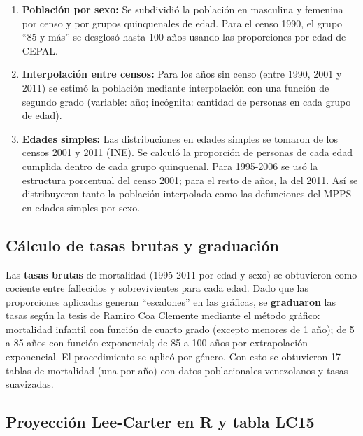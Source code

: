 \documentclass[
  11pt,
  a4paper,
]{article}
\begin{document}
\begin{enumerate}
\def\labelenumi{\arabic{enumi}.}
\item
  \textbf{Población por sexo:} Se subdividió la población en masculina y
  femenina por censo y por grupos quinquenales de edad. Para el censo
  1990, el grupo ``85 y más'' se desglosó hasta 100 años usando las
  proporciones por edad de CEPAL.
\item
  \textbf{Interpolación entre censos:} Para los años sin censo (entre
  1990, 2001 y 2011) se estimó la población mediante interpolación con
  una función de segundo grado (variable: año; incógnita: cantidad de
  personas en cada grupo de edad).
\item
  \textbf{Edades simples:} Las distribuciones en edades simples se
  tomaron de los censos 2001 y 2011 (INE). Se calculó la proporción de
  personas de cada edad cumplida dentro de cada grupo quinquenal. Para
  1995-2006 se usó la estructura porcentual del censo 2001; para el
  resto de años, la del 2011. Así se distribuyeron tanto la población
  interpolada como las defunciones del MPPS en edades simples por sexo.
\end{enumerate}

\subsection{Cálculo de tasas brutas y
graduación}\label{cuxe1lculo-de-tasas-brutas-y-graduaciuxf3n}

Las \textbf{tasas brutas} de mortalidad (1995-2011 por edad y sexo) se
obtuvieron como cociente entre fallecidos y sobrevivientes para cada
edad. Dado que las proporciones aplicadas generan ``escalones'' en las
gráficas, se \textbf{graduaron} las tasas según la tesis de Ramiro Coa
Clemente mediante el método gráfico: mortalidad infantil con función de
cuarto grado (excepto menores de 1 año); de 5 a 85 años con función
exponencial; de 85 a 100 años por extrapolación exponencial. El
procedimiento se aplicó por género. Con esto se obtuvieron 17 tablas de
mortalidad (una por año) con datos poblacionales venezolanos y tasas
suavizadas.

\subsection{Proyección Lee-Carter en R y tabla
LC15}\label{proyecciuxf3n-lee-carter-en-r-y-tabla-lc15}
\end{document}
